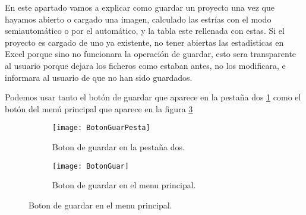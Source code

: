 En este apartado vamos a explicar como guardar un proyecto una vez que hayamos abierto o cargado una imagen, calculado las estrías con el modo semiautomático o por el automático, y la tabla este rellenada con estas. 
Si el proyecto es cargado de uno ya existente, no tener abiertas las estadísticas en Excel porque sino no funcionara la operación de guardar, esto sera transparente al usuario porque dejara los ficheros como estaban antes, no los modificara, e informara al usuario de que no han sido guardados. 

Podemos usar tanto el botón de guardar que aparece en la pestaña dos \ref{fig:BotonGuarPesta} como el botón del menú principal que aparece en la figura \ref{fig:BotonGuar}

\begin{figure}
	\begin{subfigure}[c]{.5\linewidth}
	\centering\large \texttt{[image: BotonGuarPesta]}
	\caption{Boton de guardar en la pestaña dos.}\label{fig:BotonGuarPesta}
	\end{subfigure}%
	\begin{subfigure}[c]{.5\linewidth}
	\centering\large \texttt{[image: BotonGuar]}
	\caption{Boton de guardar en el menu principal.}\label{fig:BotonGuar}
	\end{subfigure}%
\end{figure}
